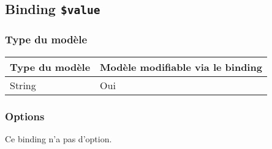 \subsection{Binding \texttt{\$value}}

\subsubsection{Type du modèle}

\begin{tabular}{|l|l|}
\hline
\textbf{Type du modèle} & \textbf{Modèle modifiable via le binding}\\
\hline
String & Oui\\
\hline
\end{tabular}
\subsubsection{Options}

Ce binding n'a pas d'option.








